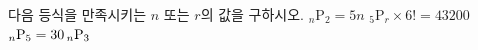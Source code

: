 다음 등식을 만족시키는 $n$ 또는 $r$의 값을 구하시오.
 ${}_n\mathrm{P}_2=5n$
 ${}_5\mathrm{P}_r\times 6!=43200$
 ${}_n\mathrm{P}_5=30\mkern3mu {}_n\mathrm{P}_3$
